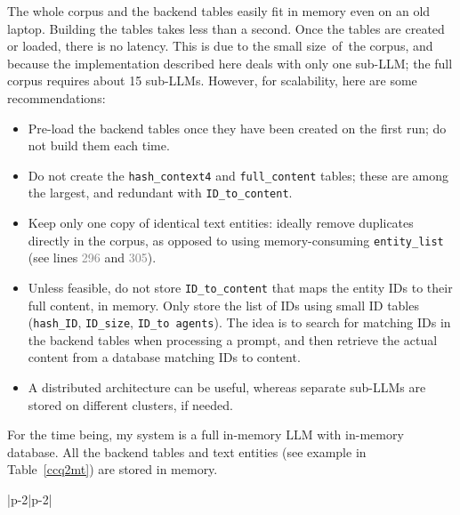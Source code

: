 \documentclass[10pt]{article}
\begin{document}
{The whole corpus and the backend tables easily fit in memory even on an old laptop. Building the tables takes less than a second. 
Once the tables are created or loaded, there is no \textcolor{index}{latency}. This is due to the small size~of~the corpus, and because the implementation described here deals with only one sub-LLM; the full corpus requires about 15 sub-LLMs. However, for \textcolor{index}{scalability}, here are some recommendations:
\vspace{1ex}
\begin{itemize}
\item Pre-load the backend tables once they have been created on the first run; do not build them each time.
\item Do not create the \texttt{hash\_context4} and \texttt{full\_content} tables; these are among the largest, and redundant with \texttt{ID\_to\_content}.
\item Keep only one copy of identical text entities: ideally remove duplicates directly in the corpus, as opposed to using 
memory-consuming \texttt{entity\_list} (see lines \textcolor{gray}{296} and \textcolor{gray}{305}).
\item Unless feasible, do not store \texttt{ID\_to\_content} that maps the entity IDs to their full content, in memory. Only store the list of IDs using
 small ID tables (\texttt{hash\_ID}, \texttt{ID\_size}, \texttt{ID\_to agents}). 
The idea is to search for matching IDs in the backend tables when processing a prompt, and then retrieve the actual content from a
 database matching IDs to content. 
\item A distributed architecture can be useful, whereas separate sub-LLMs are stored on different clusters, if needed.
\end{itemize}
\vspace{1ex}

\noindent For the time being, my system is a full \textcolor{index}{in-memory LLM}
with \textcolor{index}{in-memory database}. All the backend tables and text entities (see example in Table~\ref{ccq2mt}) are stored in memory.  

\begin{center}
\begin{longtblr}[caption={\label{ccq2mt}Sample text entity from corporate corpus}]{|p{-2\tabcolsep}|p{-2\tabcolsep}|}


\end{longtblr}
\end{center}}
\end{document}
